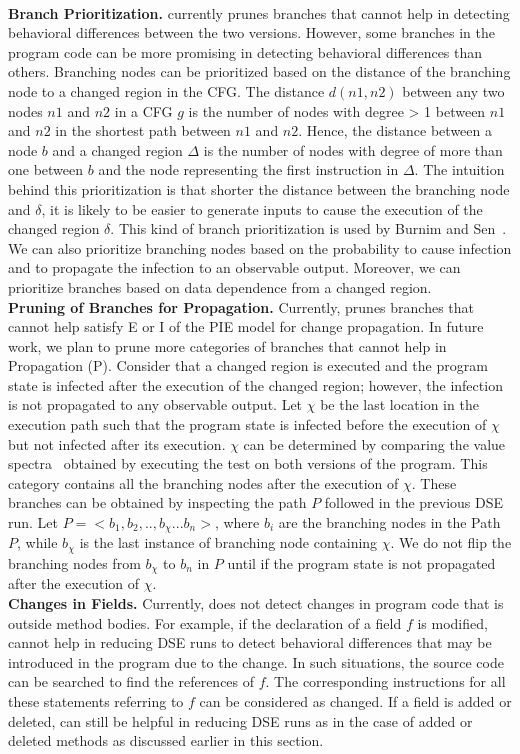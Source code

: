\\ \textbf{Branch Prioritization.}  currently prunes branches that cannot help in detecting behavioral differences between the two versions. However, some branches in the program code can be more promising in detecting behavioral differences than others. Branching nodes can be prioritized based on the distance of the branching node to a changed region in the CFG. The distance $d(n1, n2)$ between any two nodes $n1$ and $n2$  in a CFG $g$ is the number of nodes with degree > 1 between $n1$ and $n2$ in the shortest path between $n1$ and $n2$. Hence, the distance between a node $b$ and a changed region $\Delta$ is the number of nodes with degree of more than one between $b$ and the node representing the first instruction in $\Delta$. The intuition behind this prioritization is that shorter the distance between the branching node and $\delta$, it is likely to be easier to generate inputs to cause the execution of the changed region $\delta$. This kind of branch prioritization is used by Burnim and Sen~\cite{burnim}. We can also prioritize branching nodes based on the probability to cause infection and to propagate the infection to an observable output. Moreover, we can prioritize branches based on data dependence from a changed region.
\\ \textbf{Pruning of Branches for Propagation.} Currently,  prunes branches that cannot help satisfy E or I of the PIE model for change propagation. In future work, we plan to prune more categories of branches that cannot help in Propagation (P). Consider that a changed region is executed and the program state is infected after the execution of the changed region; however, the infection is not propagated to any observable output. Let $\chi$ be the last location in the execution path such that the program state is infected before the execution of $\chi$ but not infected after its execution. $\chi$ can be determined by comparing the value spectra~\cite{xie05:spectra, xie05:checking} obtained by executing the test on both versions of the program. This category contains all the branching nodes after the execution of $\chi$. These branches can be obtained by inspecting the path $P$ followed in the previous DSE run. Let $P = <b_1, b_2,.., b_\chi...b_n>$, where $b_i$ are the branching nodes in the Path $P$, while $b_\chi$ is the last instance of branching node containing $\chi$. We do not flip the branching nodes from $b_\chi$ to $b_n$ in $P$ until if the program state is not propagated after the execution of $\chi$.
\\ \textbf{Changes in Fields.} Currently,  does not detect changes in program code that is outside method bodies. For example, if the declaration of a field $f$ is modified,  cannot help in reducing DSE runs to detect behavioral differences that may be introduced in the program due to the change. In such situations, the source code can be searched to find the references of $f$. The corresponding instructions for all these statements referring to $f$ can be considered as changed. If a field is added or deleted,  can still be helpful in reducing DSE runs as in the case of added or deleted methods as discussed earlier in this section.

